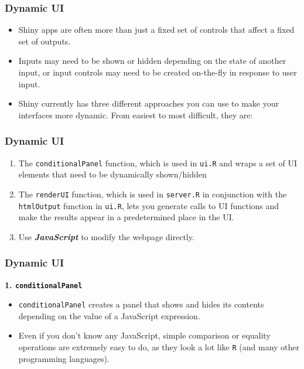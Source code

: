 \documentclass{beamer}
\begin{document}
\begin{frame}
\frametitle{Dynamic UI}
\Large
\begin{itemize}
\item Shiny apps are often more than just a fixed set of controls that affect a fixed set of outputs. \item Inputs may need to be shown or hidden depending on the state of another input, or input controls may need to be created on-the-fly in response to user input.
\item Shiny currently has three different approaches you can use to make your interfaces more dynamic. From easiest to most difficult, they are:
\end{itemize}
\end{frame}

\begin{frame}
\frametitle{Dynamic UI}
\Large
\begin{enumerate}
\item The \texttt{conditionalPanel} function, which is used in \texttt{ui.R} and wraps a set of UI elements that need to be dynamically shown/hidden
\item The \texttt{renderUI} function, which is used in \texttt{server.R} in conjunction with the \texttt{htmlOutput} function in \texttt{ui.R}, lets you generate calls to UI functions and make the results appear in a predetermined place in the UI.

\item Use \textit{\textbf{JavaScript}} to modify the webpage directly.
\end{enumerate}
\end{frame}

\begin{frame}[fragile]
\frametitle{Dynamic UI}
\Large
\textbf{1. \texttt{conditionalPanel}}\\
\begin{itemize}
\item \texttt{conditionalPanel} creates a panel that shows and hides its contents depending on the value of a JavaScript expression. \item Even if you don’t know any JavaScript, simple comparison or equality operations are extremely easy to do, as they look a lot like \texttt{R} (and many other programming languages).
\end{itemize}
\end{frame}
\end{document}
